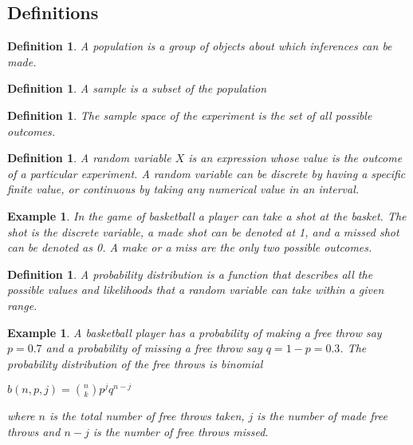 \documentclass[11pt,a4paper]{article}
\theoremstyle{plain}
\newtheorem{de}[fact]{Definition}
\newtheorem{exmp}[fact]{Example}
\begin{document}
\subsection{\bf Definitions}
\begin{de}
A population is a group of objects about which inferences can be made.
\end{de}
\begin{de}
A sample is a subset of the population
\end{de}

\begin{de}
The sample space of the experiment is the set of all possible outcomes. 
\end{de}
\begin{de}
A random variable $X$ is an expression whose value is the outcome of a particular experiment. A random variable can be discrete by having a specific finite value, or continuous by taking any numerical value in an interval.
\end{de}
\begin{exmp}
In the game of basketball a player can take a shot at the basket. The shot is the discrete variable, a made shot can be denoted at 1, and a missed shot can be denoted as 0. A make or a miss are the only two possible outcomes.

\end{exmp}



\begin{de}A probability distribution is a function that describes all the possible values and likelihoods that a random variable can take within a given range.
\end{de}
\begin{exmp}
A basketball player has a probability of making a free throw say $p=0.7$ and a probability of missing a free throw say $q=1-p=0.3$. The probability distribution of the free throws is binomial
\begin{center}
$b(n,p,j)=\binom{n}{k}p^jq^{n-j}$
\end{center}
where $n$ is the total number of free throws taken,  $j$ is the  number of made free throws and $n-j$ is the number of free throws missed.

\end{exmp}
\end{document}
